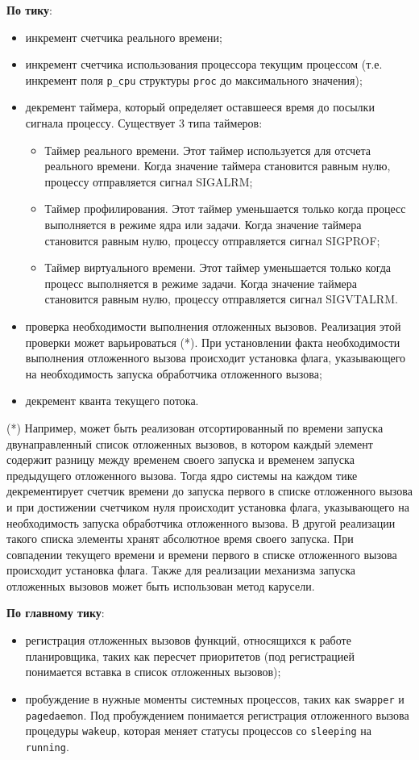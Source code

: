 \textbf{По тику}:
\begin{itemize}
    \item инкремент счетчика реального времени;
    \item инкремент счетчика использования процессора текущим процессом (т.е. инкремент поля \texttt{p\_cpu} структуры \texttt{proc} до максимального значения);
        \item декремент таймера, который определяет оставшееся время до посылки сигнала процессу. Существует 3 типа таймеров:
\begin{itemize}
\item Таймер реального времени. Этот таймер используется для отсчета реального времени. Когда значение таймера становится равным нулю, процессу отправляется сигнал SIGALRM;
\item Таймер профилирования. Этот таймер уменьшается только когда процесс выполняется в режиме ядра или задачи. Когда значение таймера становится равным нулю, процессу отправляется сигнал SIGPROF;
\item Таймер виртуального времени. Этот таймер уменьшается только когда процесс выполняется в режиме задачи. Когда значение таймера становится равным нулю, процессу отправляется сигнал SIGVTALRM.
        \end{itemize}
    \item проверка необходимости выполнения отложенных вызовов. Реализация этой проверки может варьироваться (*). При установлении факта необходимости выполнения отложенного вызова происходит установка флага, указывающего на необходимость запуска обработчика отложенного вызова;
    \item декремент кванта текущего потока.
\end{itemize}
(*) Например, может быть реализован отсортированный по времени запуска двунаправленный список отложенных вызовов, в котором каждый элемент содержит разницу между временем своего запуска и временем запуска предыдущего отложенного вызова. Тогда ядро системы на каждом тике декрементирует счетчик времени до запуска первого в списке отложенного вызова и при достижении счетчиком нуля происходит установка флага, указывающего на необходимость запуска обработчика отложенного вызова. В другой реализации такого списка элементы хранят абсолютное время своего запуска. При совпадении текущего времени и времени первого в списке отложенного вызова происходит установка флага. Также для реализации механизма запуска отложенных вызовов может быть использован метод карусели.

\textbf{По главному тику}:
\begin{itemize}
    \item регистрация отложенных вызовов функций, относящихся к работе планировщика, таких как пересчет приоритетов (под регистрацией понимается вставка в список отложенных вызовов);
    \item пробуждение в нужные моменты системных процессов, таких как \texttt{swapper} и \texttt{pagedaemon}.
        Под пробуждением понимается регистрация отложенного вызова процедуры \texttt{wakeup}, которая меняет статусы процессов со \texttt{sleeping} на \texttt{running}.
\end{itemize}

